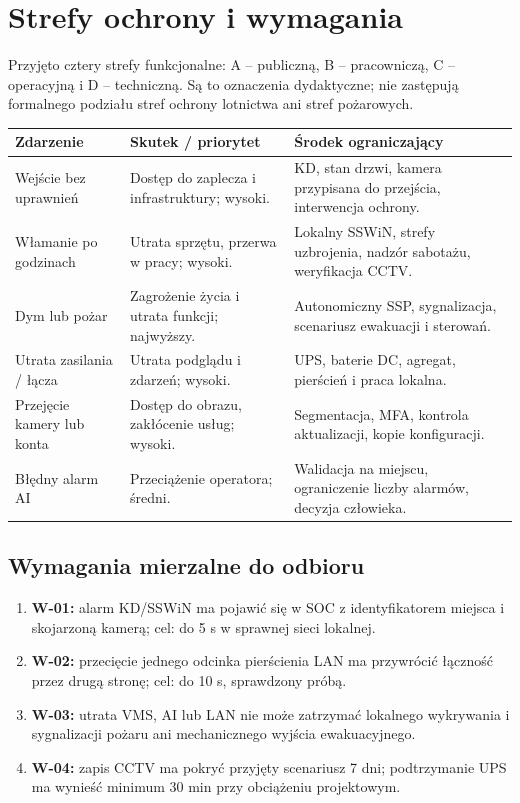 \section{Strefy ochrony i wymagania}
Przyjęto cztery strefy funkcjonalne: A -- publiczną, B -- pracowniczą, C -- operacyjną i D -- techniczną. Są to oznaczenia dydaktyczne; nie zastępują formalnego podziału stref ochrony lotnictwa ani stref pożarowych.

\begin{tabularx}{\linewidth}{@{}P{33mm}Y Y@{}}
\toprule\textbf{Zdarzenie} & \textbf{Skutek / priorytet} & \textbf{Środek ograniczający}\\\midrule
Wejście bez uprawnień & Dostęp do zaplecza i infrastruktury; wysoki. & KD, stan drzwi, kamera przypisana do przejścia, interwencja ochrony.\\
Włamanie po godzinach & Utrata sprzętu, przerwa w pracy; wysoki. & Lokalny SSWiN, strefy uzbrojenia, nadzór sabotażu, weryfikacja CCTV.\\
Dym lub pożar & Zagrożenie życia i utrata funkcji; najwyższy. & Autonomiczny SSP, sygnalizacja, scenariusz ewakuacji i sterowań.\\
Utrata zasilania / łącza & Utrata podglądu i zdarzeń; wysoki. & UPS, baterie DC, agregat, pierścień i praca lokalna.\\
Przejęcie kamery lub konta & Dostęp do obrazu, zakłócenie usług; wysoki. & Segmentacja, MFA, kontrola aktualizacji, kopie konfiguracji.\\
Błędny alarm AI & Przeciążenie operatora; średni. & Walidacja na miejscu, ograniczenie liczby alarmów, decyzja człowieka.\\\bottomrule
\end{tabularx}

\subsection*{Wymagania mierzalne do odbioru}
\begin{enumerate}
\item \textbf{W-01:} alarm KD/SSWiN ma pojawić się w SOC z identyfikatorem miejsca i skojarzoną kamerą; cel: do 5 s w sprawnej sieci lokalnej.
\item \textbf{W-02:} przecięcie jednego odcinka pierścienia LAN ma przywrócić łączność przez drugą stronę; cel: do 10 s, sprawdzony próbą.
\item \textbf{W-03:} utrata VMS, AI lub LAN nie może zatrzymać lokalnego wykrywania i sygnalizacji pożaru ani mechanicznego wyjścia ewakuacyjnego.
\item \textbf{W-04:} zapis CCTV ma pokryć przyjęty scenariusz 7 dni; podtrzymanie UPS ma wynieść minimum 30 min przy obciążeniu projektowym.
\end{enumerate}

